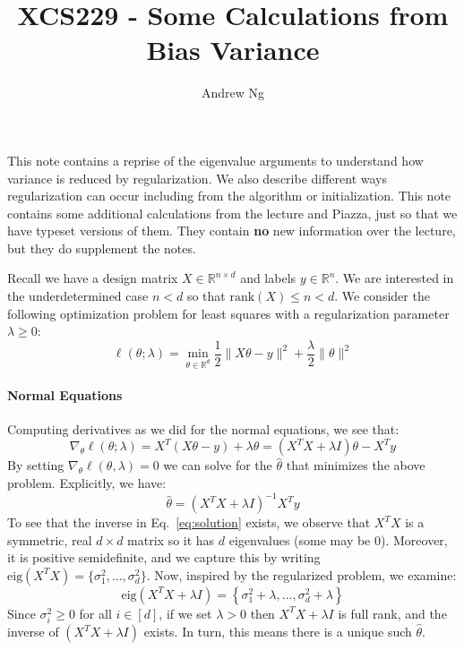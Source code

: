\documentclass{article}
\newcommand{\R}{\mathbb{R}}
\begin{document}
\title{XCS229 - Some Calculations from Bias Variance} 
\author{Andrew Ng}
\date{}
\maketitle

\noindent
This note contains a reprise of the eigenvalue arguments to understand
how variance is reduced by regularization. We also
describe different ways regularization can occur including from the
algorithm or initialization. This note contains
some additional calculations from the lecture and Piazza, just so that
we have typeset versions of them. They contain \textbf{no} new
information over the lecture, but they do supplement the notes. 


Recall we have a design matrix $X \in \mathbb{R}^{n \times d}$ and
labels $y \in \R^{n}$. We are interested in the underdetermined case
$n < d$ so that $\mathrm{rank}(X) \leq n < d$. We consider the following
optimization problem for least squares with a regularization parameter
$\lambda \geq 0$:
\[ \ell(\theta; \lambda) = \min_{\theta \in \R^d} \frac{1}{2} \|X\theta - y\|^2 + \frac{\lambda}{2} \|\theta\|^2 \]

\paragraph*{Normal Equations}
Computing derivatives as we did for the normal equations, we see that:
\[ \nabla_{\theta} \ell(\theta;\lambda) = X^T(X\theta - y) + \lambda \theta = (X^TX + \lambda I)\theta - X^Ty  \]
By setting $\nabla_{\theta} \ell(\theta, \lambda) = 0$ we can solve
for the $\hat{\theta}$ that minimizes the above problem. Explicitly, we have:
\begin{equation}
  \hat{\theta} = \left(X^TX + \lambda I\right)^{-1}X^Ty
\label{eq:solution}\end{equation}
\noindent
To see that the inverse in Eq.~\ref{eq:solution} exists, we observe
that $X^TX$ is a symmetric, real $d \times d$ matrix so it has $d$
eigenvalues (some may be $0$). Moreover, it is
positive semidefinite, and we capture this by writing $\mathrm{eig}(X^TX)
= \{\sigma_1^2, \dots, \sigma_d^2\}$. Now, inspired by the regularized
problem, we examine:
\[ \mathrm{eig}(X^TX + \lambda I) = \left\{\sigma_1^2 + \lambda, \dots, \sigma_{d}^2 + \lambda\right\} \]
Since $\sigma_i^2 \geq 0$ for all $i \in [d]$, if we set $\lambda > 0$
then $X^TX + \lambda I$ is full rank, and the inverse of $(X^TX +
\lambda I)$ exists. In turn, this means there is a unique such
$\hat{\theta}$.
\end{document}
